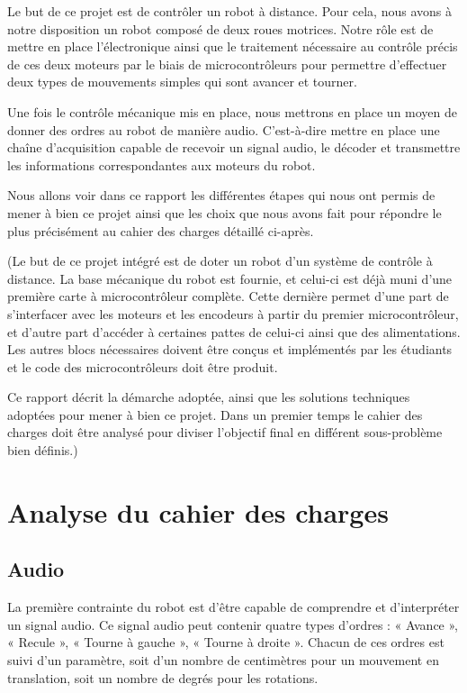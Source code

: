 Le but de ce projet est de contrôler un robot à distance. Pour cela, nous avons à notre disposition un robot composé de deux roues motrices. Notre rôle est de mettre en place l’électronique ainsi que le traitement nécessaire au contrôle précis de ces deux moteurs par le biais de microcontrôleurs pour permettre d’effectuer deux types de mouvements simples qui sont avancer et tourner.

Une fois le contrôle mécanique mis en place, nous mettrons en place un moyen de donner des ordres au robot de manière audio. C’est-à-dire mettre en place une chaîne d’acquisition capable de recevoir un signal audio, le décoder et transmettre les informations correspondantes aux moteurs du robot.

Nous allons voir dans ce rapport les différentes étapes qui nous ont permis de mener à bien ce projet ainsi que les choix que nous avons fait pour répondre le plus précisément au cahier des charges détaillé ci-après.

(Le but de ce projet intégré est de doter un robot d'un système de contrôle à distance. La base mécanique du robot est fournie, et celui-ci est déjà muni d'une première carte à microcontrôleur complète. Cette dernière permet d'une part de s'interfacer avec les moteurs et les encodeurs à partir du premier microcontrôleur, et d'autre part d'accéder à certaines pattes de celui-ci ainsi que des alimentations. Les autres blocs nécessaires doivent être conçus et implémentés par les étudiants et le code des microcontrôleurs doit être produit.

Ce rapport décrit la démarche adoptée, ainsi que les solutions techniques adoptées pour mener à bien ce projet. Dans un premier temps le cahier des charges doit être analysé pour diviser l'objectif final en différent sous-problème bien définis.)

\section{Analyse du cahier des charges}

\subsection{Audio}

La première contrainte du robot est d’être capable de comprendre et d’interpréter un signal audio. Ce signal audio peut contenir quatre types d’ordres : « Avance », « Recule », « Tourne à gauche », « Tourne à droite ». Chacun de ces ordres est suivi d’un paramètre, soit d’un nombre de centimètres pour un mouvement en translation, soit un nombre de degrés pour les rotations.

